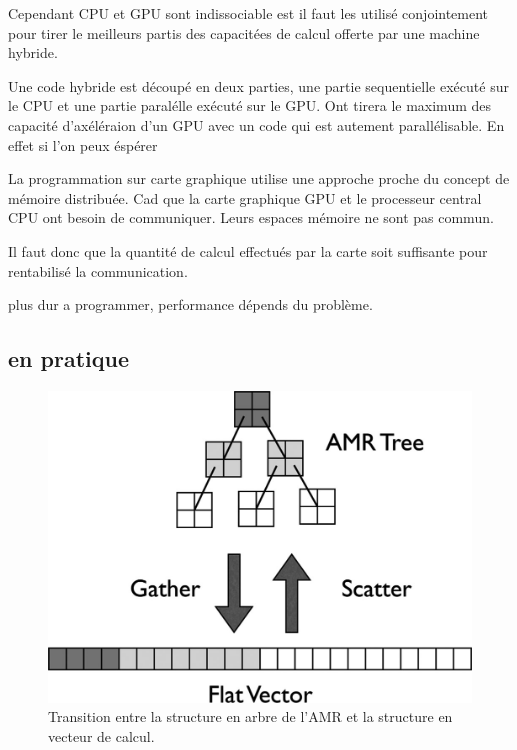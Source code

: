%
%
%
%
%

 

Cependant CPU et GPU sont indissociable est il faut les utilisé conjointement pour tirer le meilleurs partis des capacitées de calcul offerte par une machine hybride.

Une code hybride est découpé en deux parties, une partie sequentielle exécuté sur le CPU et une partie paralélle exécuté sur le GPU.
Ont tirera le maximum des capacité d'axéléraion d'un GPU avec un code qui est autement parallélisable.
En effet si l'on peux éspérer



La programmation sur carte graphique utilise une approche proche du concept de mémoire distribuée.
Cad que la carte graphique GPU et le processeur central CPU ont besoin de communiquer.
Leurs espaces mémoire ne sont pas commun.

Il faut donc que la quantité de calcul effectués par la carte soit suffisante pour rentabilisé la communication.


plus dur a programmer, performance dépends du problème.



\subsection{en pratique}


\begin{figure}[bth]
        \includegraphics[width=.95\linewidth]{img/02/gatherscatter.jpg} 
        \caption{Transition entre la structure en arbre de l'AMR et la structure en vecteur de calcul.
}
 		\label{fig:hilbert}
\end{figure}

